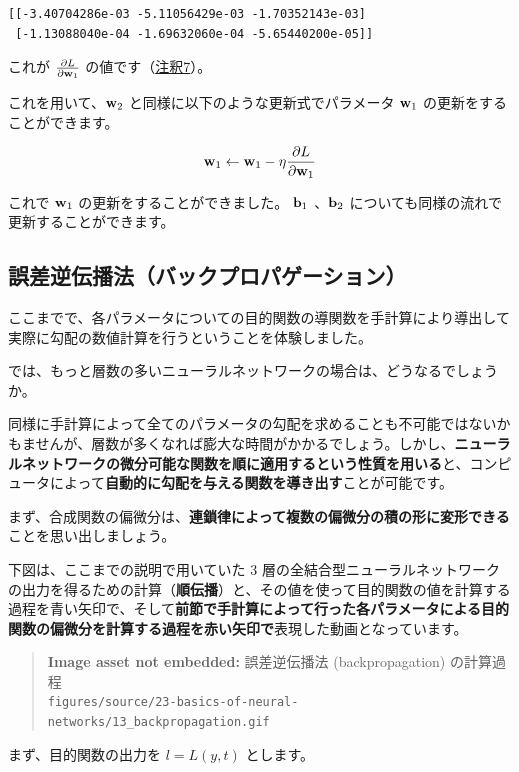 \begin{lstlisting}[style=outputcell]
[[-3.40704286e-03 -5.11056429e-03 -1.70352143e-03]
 [-1.13088040e-04 -1.69632060e-04 -5.65440200e-05]]
\end{lstlisting}

これが $\frac{\partial L}{\partial {\bf w}_1}$ の値です（\hyperref[23-basics-of-neural-networks-note7]{注釈7}）。

これを用いて、${\bf w}_2$ と同様に以下のような更新式でパラメータ ${\bf w}_1$ の更新をすることができます。


\[
{\bf w}_1 \leftarrow {\bf w}_1 - \eta \frac{\partial L}{\partial {\bf w}_1}
\]


これで ${\bf w}_1$ の更新をすることができました。 ${\bf b}_1$ 、${\bf b}_2$ についても同様の流れで更新することができます。


\subsection{誤差逆伝播法（バックプロパゲーション）}


ここまでで、各パラメータについての目的関数の導関数を手計算により導出して実際に勾配の数値計算を行うということを体験しました。

では、もっと層数の多いニューラルネットワークの場合は、どうなるでしょうか。


同様に手計算によって全てのパラメータの勾配を求めることも不可能ではないかもませんが、層数が多くなれば膨大な時間がかかるでしょう。しかし、\textbf{ニューラルネットワークの微分可能な関数を順に適用するという性質を用いる}と、コンピュータによって\textbf{自動的に勾配を与える関数を導き出す}ことが可能です。


まず、合成関数の偏微分は、\textbf{連鎖律によって複数の偏微分の積の形に変形できる}ことを思い出しましょう。


下図は、ここまでの説明で用いていた 3 層の全結合型ニューラルネットワークの出力を得るための計算（\textbf{順伝播}）と、その値を使って目的関数の値を計算する過程を青い矢印で、そして\textbf{前節で手計算によって行った各パラメータによる目的関数の偏微分を計算する過程を赤い矢印で}表現した動画となっています。


\begin{quote}
\textbf{Image asset not embedded:} 誤差逆伝播法 (backpropagation) の計算過程\\
\texttt{figures/source/23-basics-of-neural-networks/13\_backpropagation.gif}
\end{quote}


まず、目的関数の出力を $l = L(y, t)$ とします。

